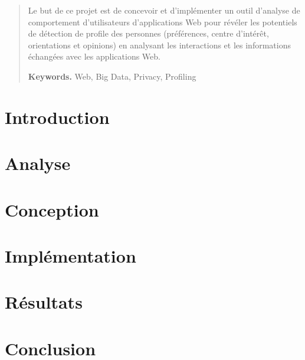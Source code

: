






\def\myTitle{Développement d'une Application Web pour la Visualisation et la Recherche de Données Médicales}
\def\myName{Kewin Dousse}
\def\myUni{HES-SO}
\def\myDepartment{TIC}
\def\mySupervisors{Sandy Ingram}
\def\myExpert{?}


\begin{abstract}

Le but de ce projet est de concevoir et d'implémenter un outil d'analyse de comportement d'utilisateurs d'applications Web pour révéler les potentiels de détection de profile des personnes (préférences, centre d'intérêt, orientations et opinions) en analysant les interactions et les informations échangées avec les applications Web.

\smallskip
\noindent \textbf{Keywords.} Web, Big Data, Privacy, Profiling

\end{abstract}
\setcounter{page}{3}
\hypersetup{pageanchor=true}

\tableofcontents
\listoffigures

\chapter{Introduction}

\chapter{Analyse}

\chapter{Conception}

\chapter{Implémentation}

\chapter{Résultats}

\chapter{Conclusion}


